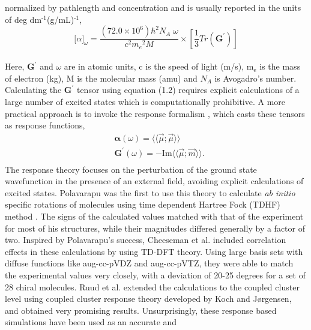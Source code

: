 normalized by pathlength and concentration and is usually reported in the units of deg dm$^{\text{-1}}$(g/mL)$^{\text{-1}}$,\cite{Crawford06}
\\
\begin{equation}
{\lbrack\alpha\rbrack}_{\omega} = \frac{(72.0 \times 10^6){\hbar}^2 N_A\;\omega}{c^2{m_e}^2 M} \times \left[ \frac{1}{3}Tr(\textbf{G}^\prime)\right]
\end{equation}
\\
Here, $\textbf{G}^\prime$ and $\omega$ are in atomic units, c is the speed of light (m/s), m$_{\text{e}}$ is the 
mass of electron (kg), M is the molecular mass (amu) and $N_A$ is Avogadro's number. Calculating the 
$\textbf{G}^\prime$ tensor using equation (1.2) requires explicit calculations of a large number of 
excited states which is computationally prohibitive. A more practical approach is to invoke the response formalism
\cite{Koch90,Kobayashi94}, which casts these tensors as response functions,
\begin{equation}
\begin{split}
&\bm{\alpha}(\omega) = \langle\langle\vec{\mu};\vec{\mu}\rangle\rangle\\
&\textbf{G}^{\prime}(\omega) = -\text{Im}\langle\langle\vec{\mu};\vec{m}\rangle\rangle.\\
\end{split}
\end{equation} 
The response theory focuses on the perturbation of the ground state wavefunction in the presence of an external 
field, avoiding explicit calculations of excited states. Polavarapu was the first to use this theory to calculate 
{\em ab initio} specific rotations of molecules using time dependent Hartree Fock (TDHF) method \cite{Polavarapu96}. 
The signs of the calculated values matched with that of the experiment for most of his structures, while their magnitudes 
differed generally by a factor of two. Inspired by Polavarapu's success, Cheeseman et al. \cite{Cheeseman00,Stephens01} 
included correlation effects in these calculations by using TD-DFT theory. Using large basis sets with diffuse functions like 
aug-cc-pVDZ and aug-cc-pVTZ,\cite{Dunning89,Kendall92,Woon94} they were able to match the experimental values very closely, with a 
deviation of 20-25 degrees for a set of 28 chiral molecules. Ruud et al. extended the calculations to the coupled cluster 
level using coupled cluster response theory developed by Koch and J{\o}rgensen\cite{Koch90}, and obtained very 
promising results\cite{Ruud03}. Unsurprisingly, these response based simulations have been used as an accurate and 
